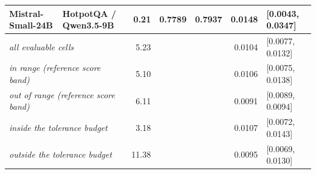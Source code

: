 \begin{table}[t]
\begin{tabular}{llrrrrl}
Mistral-Small-24B & HotpotQA / Qwen3.5-9B & 0.21 & 0.7789 & 0.7937 & 0.0148 & [0.0043, 0.0347] \\
\midrule
\multicolumn{2}{l}{\emph{all evaluable cells}} & 5.23 & & & 0.0104 & [0.0077, 0.0132] \\
\multicolumn{2}{l}{\emph{in range (reference score band)}} & 5.10 & & & 0.0106 & [0.0075, 0.0138] \\
\multicolumn{2}{l}{\emph{out of range (reference score band)}} & 6.11 & & & 0.0091 & [0.0089, 0.0094] \\
\multicolumn{2}{l}{\emph{inside the tolerance budget}} & 3.18 & & & 0.0107 & [0.0072, 0.0143] \\
\multicolumn{2}{l}{\emph{outside the tolerance budget}} & 11.38 & & & 0.0095 & [0.0069, 0.0130] \\
\bottomrule
\end{tabular}
\end{table}
